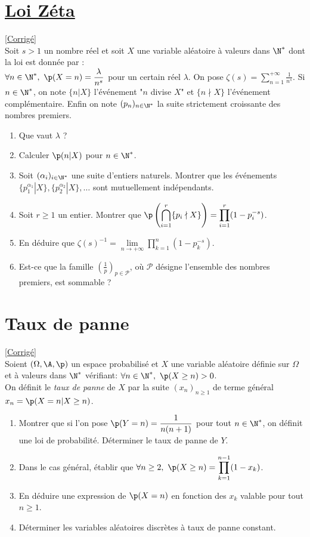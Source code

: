 \documentclass[8pt]{book}
\begin{document}
\section{\underline{Loi Zéta} }
\label{Loi Zéta}
\textcolor{blue}{\hyperref[Loi Zéta corrigé]{[Corrigé]}}\\
Soit $s>1$ un nombre réel et soit $X$ une variable aléatoire à valeurs dans $\N^*$ dont la loi est donnée par :\\
$\forall n\in \N^*,\ \p(X=n)=\displaystyle\frac{\lambda}{n^s}$ pour un certain réel $\lambda$. On pose $\zeta(s)=\displaystyle\sum\limits_{n=1}^{+\infty}\frac{1}{n^s}$. Si $n\in\N^*$, on note $\{n|X\}$ l'événement "$n$ divise $X$" et $\{n\nmid X\}$ l'événement complémentaire. Enfin on note $(p_n)_{n\in \N^*}$ la suite strictement croissante des nombres premiers.
\begin{enumerate}
	\item Que vaut $\lambda$ ?
	\item Calculer $\p(n|X)$ pour $n\in\N^*$.
	\item Soit $(\alpha_i)_{i\in\N^*}$ une suite d'entiers naturels. Montrer que les événements $\{p_1^{\alpha_1}|X\},\{p_2^{\alpha_2}|X\},\dots$ sont mutuellement indépendants.
	\item Soit $r\geq1$ un entier. Montrer que $\p\left(\displaystyle\bigcap\limits_{i=1}^r\{p_i\nmid X\}\right)=\displaystyle\prod\limits_{i=1}^r(1-p_i^{-s})$.
	\item En déduire que $\zeta(s)^{-1}=\lim\limits_{n\to+\infty}\displaystyle\prod\limits_{k=1}^n \left(1-p_k^{-s}\right)$.
	\item Est-ce que la famille $\left(\displaystyle\frac{1}{p}\right)_{p\in\mathcal{P}}$, où $\mathcal{P}$ désigne l'ensemble des nombres premiers, est sommable ?
\end{enumerate}

\section{Taux de panne }
\label{Taux de panne}
\textcolor{blue}{\hyperref[Taux de panne corrigé]{[Corrigé]}}\\
Soient $(\Omega,\A,\p)$ un espace probabilisé et $X$ une variable aléatoire définie sur $\Omega$ et à valeurs dans $\N^*$ vérifiant: $\forall n\in\N^*, \ \p(X\geq n)>0$.
\\On définit le \textit{taux de panne} de $X$ par la suite $(x_n)_{n\geq 1}$ de terme général $x_n=\p(X=n|X\geq n)$.
\begin{enumerate}
	\item Montrer que si l'on pose $\p(Y=n)=\dfrac{1}{n(n+1)}$ pour tout $n\in\N^*$, on définit une loi de probabilité. Déterminer le taux de panne de $Y$.
	\item Dans le cas général, établir que $\forall n\geq 2, \ \p(X\geq n)=\displaystyle\prod_{k=1}^{n-1}(1-x_k)$.
	\item En déduire une expression de $\p(X=n)$ en fonction des $x_k$ valable pour tout $n\geq 1$.
	\item Déterminer les variables aléatoires discrètes à taux de panne constant.
\end{enumerate}
\end{document}
